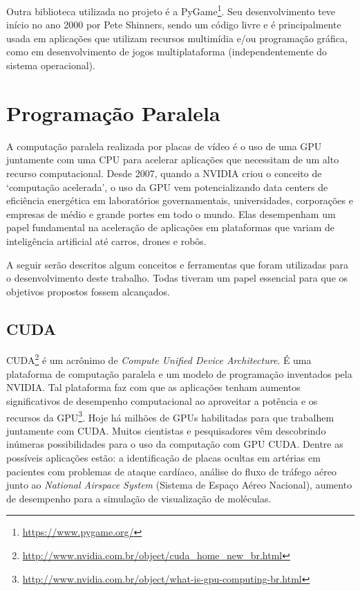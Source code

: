 \documentclass[
	12pt,				%
	openright,			%
	twoside,			%
	a4paper,			%
	english,			%
	french,				%
	spanish,			%
	brazil				%
	]{abntex2}
\begin{document}
Outra biblioteca utilizada no projeto é a PyGame\footnote{\url{https://www.pygame.org/}}. Seu desenvolvimento teve início no ano 2000 por  Pete Shinners, sendo um código livre e é principalmente usada em aplicações que utilizam recursos multimídia e/ou programação gráfica, como em desenvolvimento de jogos multiplataforma (independentemente do sistema operacional).    

\section[Programação Paralela]{Programação Paralela}

A computação paralela realizada por placas de vídeo é o uso de uma  GPU juntamente com uma CPU para acelerar aplicações que necessitam de um alto recurso computacional. Desde 2007, quando a NVIDIA criou o conceito de ‘computação acelerada’, o uso da GPU vem potencializando data centers de eficiência energética em laboratórios governamentais, universidades, corporações e empresas de médio e grande portes em todo o mundo. Elas desempenham um papel fundamental na aceleração de aplicações em plataformas que variam de inteligência artificial até carros, drones e robôs.

A seguir serão descritos algum conceitos e ferramentas que foram utilizadas para o desenvolvimento deste trabalho. Todas tiveram um papel essencial para que os objetivos propostos fossem alcançados.


\subsection[CUDA]{CUDA}

CUDA\footnote{\url{http://www.nvidia.com.br/object/cuda_home_new_br.html}} é um acrônimo de \textit{Compute Unified Device Architecture}. É uma plataforma de computação paralela e um modelo de programação inventados pela NVIDIA. Tal plataforma faz com que as aplicações tenham aumentos significativos de desempenho computacional ao aproveitar a potência e os recursos da GPU\footnote{\url{http://www.nvidia.com.br/object/what-is-gpu-computing-br.html}}. Hoje há milhões de GPUs habilitadas para que trabalhem juntamente com CUDA. Muitos cientistas e pesquisadores vêm descobrindo inúmeras possibilidades para o uso da computação com GPU CUDA. Dentre as possíveis aplicações estão: a identificação de placas ocultas em artérias em pacientes com problemas de ataque cardíaco, análise do fluxo de tráfego aéreo junto ao \textit{National Airspace System} (Sistema de Espaço Aéreo Nacional), aumento de desempenho para a simulação de visualização de moléculas.
\end{document}
